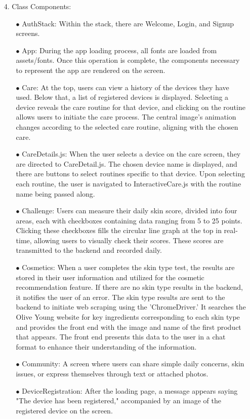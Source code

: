 \documentclass[conference]{IEEEtran}
\begin{document}
\begin{itemize}
\item[4.] Class Components:
\begin{itemize}
    \item[$\bullet$] AuthStack: Within the stack, there are Welcome, Login, and Signup screens.
    \item[$\bullet$] App: During the app loading process, all fonts are loaded from assets/fonts. Once this operation is complete, the components necessary to represent the app are rendered on the screen.
    \item[$\bullet$] Care: At the top, users can view a history of the devices they have used. Below that, a list of registered devices is displayed. Selecting a device reveals the care routine for that device, and clicking on the routine allows users to initiate the care process. The central image's animation changes according to the selected care routine, aligning with the chosen care.
    \item[$\bullet$] CareDetails.js: When the user selects a device on the care screen, they are directed to CareDetail.js. The chosen device name is displayed, and there are buttons to select routines specific to that device. Upon selecting each routine, the user is navigated to InteractiveCare.js with the routine name being passed along.
     \item[$\bullet$] Challenge: Users can measure their daily skin score, divided into four areas, each with checkboxes containing data ranging from 5 to 25 points. Clicking these checkboxes fills the circular line graph at the top in real-time, allowing users to visually check their scores. These scores are transmitted to the backend and recorded daily.
    \item[$\bullet$] Cosmetics: When a user completes the skin type test, the results are stored in their user information and utilized for the cosmetic recommendation feature. If there are no skin type results in the backend, it notifies the user of an error. The skin type results are sent to the backend to initiate web scraping using the 'ChromeDriver.' It searches the Olive Young website for key ingredients corresponding to each skin type and provides the front end with the image and name of the first product that appears. The front end presents this data to the user in a chat format to enhance their understanding of the information.
    \item[$\bullet$] Community: A screen where users can share simple daily concerns, skin issues, or express themselves through text or attached photos.
    \item[$\bullet$] DeviceRegistration: After the loading page, a message appears saying "The device has been registered," accompanied by an image of the registered device on the screen.

\end{itemize}
\end{itemize}
\end{document}
